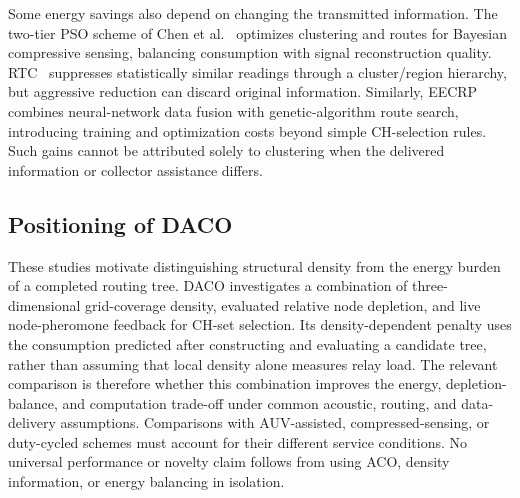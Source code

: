 Some energy savings also depend on changing the transmitted information.
The two-tier PSO scheme of Chen et al.~\cite{Chen2020TwoTierPSO} optimizes
clustering and routes for Bayesian compressive sensing, balancing consumption
with signal reconstruction quality. RTC~\cite{Ahmed2019RTC} suppresses
statistically similar readings through a cluster/region hierarchy, but
aggressive reduction can discard original information. Similarly,
EECRP~\cite{Xiao2021EECRP} combines neural-network data fusion with
genetic-algorithm route search, introducing training and optimization costs
beyond simple CH-selection rules. Such gains cannot be attributed solely
to clustering when the delivered information or collector assistance differs.

\subsection{Positioning of DACO}

These studies motivate distinguishing structural density from the energy
burden of a completed routing tree. DACO investigates a combination of
three-dimensional grid-coverage density, evaluated relative node depletion,
and live node-pheromone feedback for CH-set selection. Its density-dependent
penalty uses the consumption predicted after constructing and evaluating a
candidate tree, rather than assuming that local density alone measures relay
load. The relevant comparison is therefore whether this combination improves
the energy, depletion-balance, and computation trade-off under common
acoustic, routing, and data-delivery assumptions. Comparisons with AUV-assisted,
compressed-sensing, or duty-cycled schemes must account for their different
service conditions. No universal performance or novelty claim follows from
using ACO, density information, or energy balancing in isolation.
